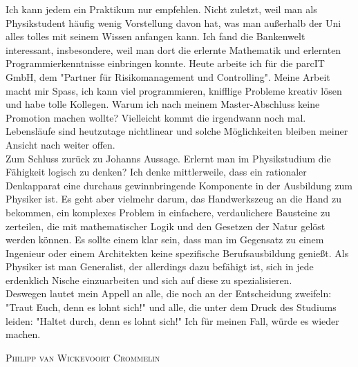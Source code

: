 \begin{multicols}{2}
Ich kann jedem ein Praktikum nur empfehlen. Nicht zuletzt, weil man als Physikstudent häufig wenig Vorstellung davon hat, was man außerhalb der Uni alles tolles mit seinem Wissen anfangen kann.
Ich fand die Bankenwelt interessant, insbesondere, weil man dort die erlernte Mathematik und erlernten Programmierkenntnisse einbringen konnte.
Heute arbeite ich für die parcIT GmbH, dem "Partner für Risikomanagement und Controlling".
Meine Arbeit macht mir Spass, ich kann viel programmieren, knifflige Probleme kreativ lösen und habe tolle Kollegen. Warum ich nach meinem Master-Abschluss keine Promotion machen wollte?
Vielleicht kommt die irgendwann noch mal. Lebensläufe sind heutzutage nichtlinear und solche Möglichkeiten bleiben meiner Ansicht nach weiter offen. \\ 

Zum Schluss zurück zu Johanns Aussage. Erlernt man im Physikstudium die Fähigkeit logisch zu denken? Ich denke mittlerweile,
dass ein rationaler Denkapparat eine durchaus gewinnbringende Komponente in der Ausbildung zum Physiker ist. Es geht aber vielmehr darum,
das Handwerkszeug an die Hand zu bekommen, ein komplexes Problem in einfachere, verdaulichere Bausteine zu zerteilen,
die mit mathematischer Logik und den Gesetzen der Natur gelöst werden können.
Es sollte einem klar sein, dass man im Gegensatz zu einem Ingenieur oder einem Architekten keine spezifische Berufsausbildung genießt.
Als Physiker ist man Generalist, der allerdings dazu befähigt ist, sich in jede erdenklich Nische einzuarbeiten und sich auf diese zu spezialisieren. \\ 

Deswegen lautet mein Appell an alle, die noch an der Entscheidung zweifeln: "Traut Euch, denn es lohnt sich!" und alle, die unter dem Druck des Studiums leiden: "Haltet durch, denn es lohnt sich!" Ich für meinen Fall, würde es wieder machen. \\ 

\vspace{0.8cm}

\textsc{Philipp van Wickevoort Crommelin}  



\end{multicols}
